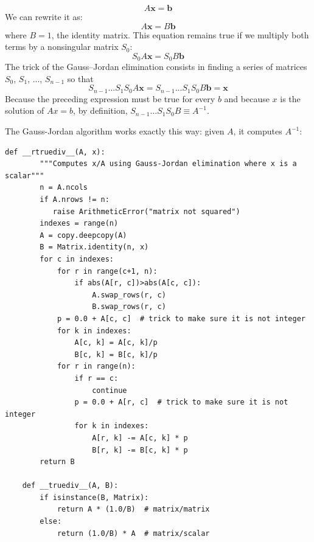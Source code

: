 \documentclass[justified, sixbynine]{tufte-book}
\def\ft{\small\tt}
\theoremstyle{plain}%
\newtheorem * {corollary}{Corollary}
\theoremstyle{definition}
\theoremstyle{remark}
\newtheorem * {remark}{Remark}
\newtheorem * {note}{Note}
\begin{document}
\begin{fullwidth}
\begin{equation}
A \mathbf{x} = \mathbf{b}
\end{equation}
We can rewrite it as:
\begin{equation}
A \mathbf{x} = B \mathbf{b}
\end{equation}
where $B=1$, the identity matrix. This equation remains true if we multiply both terms by a nonsingular matrix $S_0$:
\begin{equation}
S_0 A \mathbf{x} = S_0 B \mathbf{b}
\end{equation}
The trick of the Gauss--Jordan elimination consists in finding a series of matrices $S_0$, $S_1$, ..., $S_{n-1}$ so that
\begin{equation}
S_{n-1} ... S_1 S_0 A \mathbf{x} = S_{n-1} ... S_1 S_0 B \mathbf{b} = \mathbf{x}
\end{equation}
Because the preceding expression must be true for every $b$ and because $x$ is the solution of $A x=b$, by definition, 
$S_{n-1} \ldots S_1 S_0 B \equiv A^{-1}$.

The Gauss-Jordan algorithm works exactly this way: given $A$, it computes $A^{-1}$:

\begin{lstlisting}[caption={in file: {\ft nlib.py}}]
    def __rtruediv__(A, x):
        """Computes x/A using Gauss-Jordan elimination where x is a scalar"""
        n = A.ncols
        if A.nrows != n:
           raise ArithmeticError("matrix not squared")
        indexes = range(n)
        A = copy.deepcopy(A)
        B = Matrix.identity(n, x)
        for c in indexes:
            for r in range(c+1, n):
                if abs(A[r, c])>abs(A[c, c]):
                    A.swap_rows(r, c)
                    B.swap_rows(r, c)
            p = 0.0 + A[c, c]  # trick to make sure it is not integer
            for k in indexes:
                A[c, k] = A[c, k]/p
                B[c, k] = B[c, k]/p
            for r in range(n):
                if r == c:
                    continue
                p = 0.0 + A[r, c]  # trick to make sure it is not integer
                for k in indexes:
                    A[r, k] -= A[c, k] * p
                    B[r, k] -= B[c, k] * p
        return B

    def __truediv__(A, B):
        if isinstance(B, Matrix):
            return A * (1.0/B)  # matrix/matrix
        else:
            return (1.0/B) * A  # matrix/scalar

\end{lstlisting}


\end{fullwidth}
\end{document}
